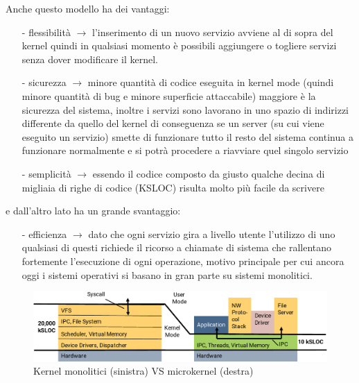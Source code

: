 Anche questo modello ha dei vantaggi:
\begin{itemize}
	\item[-] flessibilità $\rightarrow$ l'inserimento di un nuovo servizio avviene al di sopra del kernel quindi in qualsiasi momento è possibili aggiungere o togliere servizi senza dover modificare il kernel.
	\item[-] sicurezza $\rightarrow$ minore quantità di codice eseguita in kernel mode (quindi minore quantità di bug e minore superficie attaccabile) maggiore è la sicurezza del sistema, inoltre i servizi sono lavorano in uno spazio di indirizzi differente da quello del kernel di conseguenza se un server (su cui viene eseguito un servizio) smette di funzionare tutto il resto del sistema continua a funzionare normalmente e si potrà procedere a riavviare quel singolo servizio
	\item[-] semplicità $\rightarrow$ essendo il codice composto da giusto qualche decina di migliaia di righe di codice (KSLOC) risulta molto più facile da scrivere
\end{itemize}
e dall'altro lato ha un grande svantaggio:
\begin{itemize}
	\item[-] efficienza $\rightarrow$ dato che ogni servizio gira a livello utente l'utilizzo di uno qualsiasi di questi richiede il ricorso a chiamate di sistema che rallentano fortemente l'esecuzione di ogni operazione, motivo principale per cui ancora oggi i sistemi operativi si basano in gran parte su sistemi monolitici.
\end{itemize}

\begin{figure}[h]
  \includegraphics[width=\linewidth]{img/MonolithicVSmicrokernel.png}
  \caption{Kernel monolitici (sinistra) VS microkernel (destra)}
  \label{fig:MonolithicVSmicrokernel}
\end{figure}
\newpage

